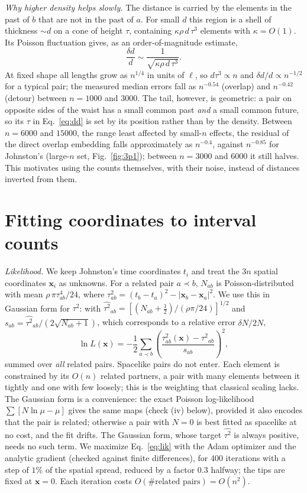\documentclass[prd,twocolumn,superscriptaddress,nofootinbib,amsmath,amssymb,floatfix]{revtex4-2}
\begin{document}
\emph{Why higher density helps slowly.} The distance is carried by the elements in the past of $b$ that are not in the past of $a$. For small $d$ this region is a shell of thickness $\sim d$ on a cone of height $\tau$, containing $\kappa\rho\,d\,\tau^3$ elements with $\kappa=O(1)$. Its Poisson fluctuation gives, as an order-of-magnitude estimate,
\begin{equation}
\frac{\delta d}{d}\sim\frac{1}{\sqrt{\kappa\rho\,d\,\tau^3}}.
\label{eq:dd}
\end{equation}
At fixed shape all lengths grow as $n^{1/4}$ in units of $\ell$, so $d\tau^3\propto n$ and $\delta d/d\propto n^{-1/2}$ for a typical pair; the measured median errors fall as $n^{-0.54}$ (overlap) and $n^{-0.42}$ (detour) between $n=1000$ and $3000$. The tail, however, is geometric: a pair on opposite sides of the waist has a small common past \emph{and} a small common future, so its $\tau$ in Eq.~\eqref{eq:dd} is set by its position rather than by the density. Between $n=6000$ and $15000$, the range least affected by small-$n$ effects, the residual of the direct overlap embedding falls approximately as $n^{-0.4}$, against $n^{-0.85}$ for Johnston's (large-$n$ set, Fig.~\ref{fig:3p1}); between $n=3000$ and $6000$ it still halves. This motivates using the counts themselves, with their noise, instead of distances inverted from them.

\section{Fitting coordinates to interval counts}\label{sec:likelihood}
\emph{Likelihood.} We keep Johnston's time coordinates $t_i$ and treat the $3n$ spatial coordinates $\mathbf x_i$ as unknowns. For a related pair $a\prec b$, $N_{ab}$ is Poisson-distributed with mean $\rho\,\pi\tau_{ab}^4/24$, where $\tau_{ab}^2=(t_b-t_a)^2-|\mathbf x_b-\mathbf x_a|^2$. We use this in Gaussian form for $\tau^2$: with $\widehat{\tau^2}_{ab}=[(N_{ab}+\tfrac12)/(\rho\pi/24)]^{1/2}$ and $s_{ab}=\widehat{\tau^2}_{ab}/(2\sqrt{N_{ab}+1})$, which corresponds to a relative error $\delta N/2N$,
\begin{equation}
\ln L(\mathbf x)=-\frac12\sum_{a\prec b}\left(\frac{\tau^2_{ab}(\mathbf x)-\widehat{\tau^2}_{ab}}{s_{ab}}\right)^{2},
\label{eq:lik}
\end{equation}
summed over \emph{all} related pairs. Spacelike pairs do not enter. Each element is constrained by its $O(n)$ related partners, a pair with many elements between it tightly and one with few loosely; this is the weighting that classical scaling lacks. The Gaussian form is a convenience: the exact Poisson log-likelihood $\sum[N\ln\mu-\mu]$ gives the same maps (check (iv) below), provided it also encodes that the pair is related; otherwise a pair with $N=0$ is best fitted as spacelike at no cost, and the fit drifts. The Gaussian form, whose target $\widehat{\tau^2}$ is always positive, needs no such term. We maximize Eq.~\eqref{eq:lik} with the Adam optimizer and the analytic gradient (checked against finite differences), for 400 iterations with a step of $1\%$ of the spatial spread, reduced by a factor $0.3$ halfway; the tips are fixed at $\mathbf x=0$. Each iteration costs $O(\#\text{related pairs})=O(n^2)$.
\end{document}
